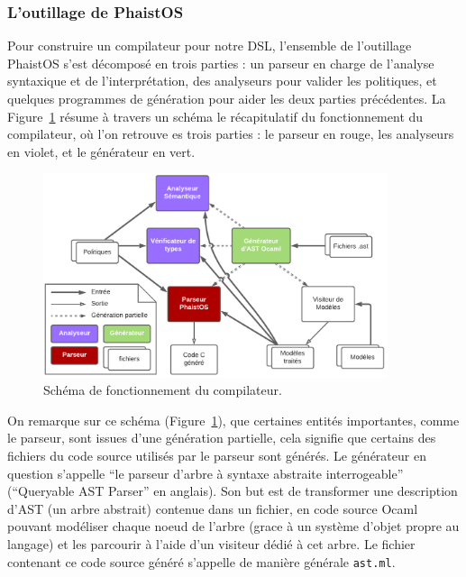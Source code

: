 \subsubsection{L'outillage de PhaistOS}

Pour construire un compilateur pour notre DSL, l'ensemble de l'outillage 
PhaistOS s'est décomposé en trois parties : un parseur en charge de l'analyse 
syntaxique et de l'interprétation, des analyseurs pour valider les politiques, 
et quelques programmes de génération pour aider les deux parties précédentes. 
La Figure~\ref{fig:compiler} résume à travers un schéma le récapitulatif du 
fonctionnement du compilateur, où l'on retrouve es trois parties : le parseur 
en rouge, les analyseurs en violet, et le générateur en vert.

\begin{figure}[h!t] \centering
    \includegraphics[width=0.9\textwidth]{images/compiler}
    \caption{Schéma de fonctionnement du compilateur.}
    \label{fig:compiler}
\end{figure}

\label{ast_files}

On remarque sur ce schéma (Figure~\ref{fig:compiler}), que certaines entités 
importantes, comme le parseur, sont issues d'une génération partielle, cela 
signifie que certains des fichiers du code source utilisés par le parseur sont 
générés. Le générateur en question s'appelle ``le parseur d'arbre à syntaxe 
abstraite interrogeable'' (``Queryable AST Parser'' en anglais). Son but est de 
transformer une description d'AST (un arbre abstrait) contenue dans un fichier, 
en code source Ocaml pouvant modéliser chaque noeud de l'arbre (grace à un 
système d'objet propre au langage) et les parcourir à l'aide d'un visiteur 
dédié à cet arbre. Le fichier contenant ce code source généré s'appelle de 
manière générale \texttt{ast.ml}.

